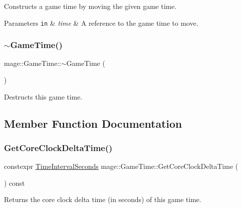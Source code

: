Constructs a game time by moving the given game time.


\begin{DoxyParams}[1]{Parameters}
\mbox{\tt in}  & {\em time} & A reference to the game time to move. \\
\hline
\end{DoxyParams}
\mbox{\label{classmage_1_1_game_time_ae7a709bde27a737be9ebed2a92e00c8b}} 
\subsubsection{\texorpdfstring{$\sim$\+Game\+Time()}{~GameTime()}}
{\footnotesize\ttfamily mage\+::\+Game\+Time\+::$\sim$\+Game\+Time (\begin{DoxyParamCaption}{ }\end{DoxyParamCaption})\hspace{0.3cm}{\ttfamily [default]}}

Destructs this game time. 

\subsection{Member Function Documentation}
\mbox{\label{classmage_1_1_game_time_ad66a5ec29ac7729191597d874441bde8}} 
\subsubsection{\texorpdfstring{Get\+Core\+Clock\+Delta\+Time()}{GetCoreClockDeltaTime()}}
{\footnotesize\ttfamily constexpr \mbox{\hyperlink{namespacemage_a21c3d1575018d1e0720948713c76be1f}{Time\+Interval\+Seconds}} mage\+::\+Game\+Time\+::\+Get\+Core\+Clock\+Delta\+Time (\begin{DoxyParamCaption}{ }\end{DoxyParamCaption}) const\hspace{0.3cm}{\ttfamily [noexcept]}}

Returns the core clock delta time (in seconds) of this game time.

